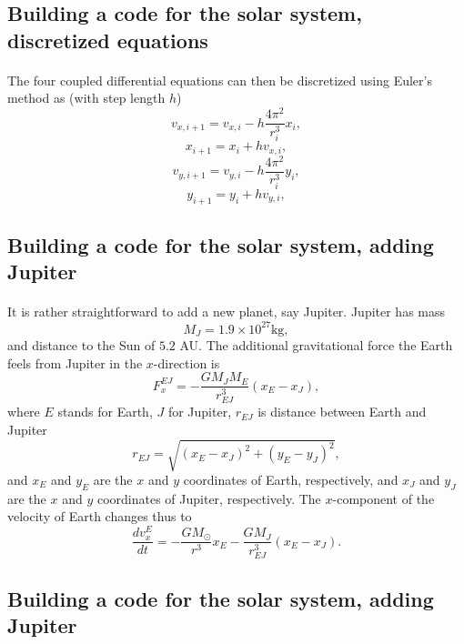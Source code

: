 \documentclass[%
oneside,                 %
final,                   %
10pt]{article}
\begin{document}
\subsection{Building a code for the solar system, discretized equations}

\paragraph{}
The four coupled differential equations can then be discretized using Euler's method as (with step length $h$)
\[
   v_{x,i+1}=v_{x,i}-h\frac{4\pi^2}{r_i^3}x_i,
\]
\[
   x_{i+1}=x_i+hv_{x,i},
\]
\[
   v_{y,i+1}=v_{y,i}-h\frac{4\pi^2}{r_i^3}y_i,
\]
\[
   y_{i+1}=y_i+hv_{y,i},
\]




\subsection{Building a code for the solar system, adding Jupiter}

\paragraph{}
It is rather straightforward to add a new planet, say Jupiter.
Jupiter has mass
\[
M_J=1.9\times 10^{27}\mathrm{kg},
\]
and distance to the Sun of $5.2$ AU. 
The additional gravitational force the Earth feels from Jupiter in the $x$-direction is
  \[
   F_{x}^{EJ}=-\frac{GM_JM_E}{r_{EJ}^3}(x_E-x_J),
  \]
where $E$ stands for Earth, $J$ for Jupiter, $r_{EJ}$ is distance between Earth and Jupiter
\[
r_{EJ} = \sqrt{(x_E-x_J)^2+(y_E-y_J)^2},
\]
and $x_E$ and $y_E$ are the $x$ and $y$ coordinates of Earth, respectively, and 
$x_J$ and $y_J$ are the $x$ and $y$ coordinates of Jupiter, respectively.
The $x$-component of the velocity of Earth changes thus to
\[
   \frac{dv_x^E}{dt}=-\frac{GM_{\odot}}{r^3}x_E-\frac{GM_J}{r_{EJ}^3}(x_E-x_J).
\]




\subsection{Building a code for the solar system, adding Jupiter}

\end{document}
